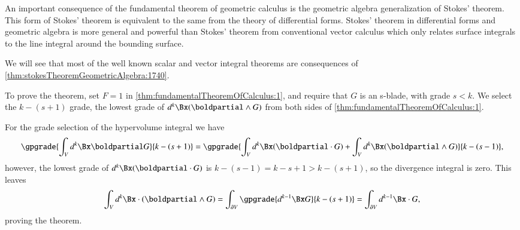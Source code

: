 %
%
An important consequence of the fundamental theorem of geometric calculus is the
geometric algebra generalization of Stokes' theorem.  This form of Stokes' theorem is equivalent to the same from the theory of differential forms.
Stokes' theorem in differential forms and geometric algebra is more general and powerful than Stokes' theorem from conventional vector calculus which only relates
surface integrals to the line integral around the bounding surface.


We will see that most of the well known scalar and vector integral theorems are consequences of \cref{thm:stokesTheoremGeometricAlgebra:1740}.

To prove the theorem, set \( F = 1 \) in \cref{thm:fundamentalTheoremOfCalculus:1}, and require that \( G \) is an s-blade, with grade \( s < k \).  We select the \( k-(s+1) \) grade, the lowest grade of \( d^k \Bx (\boldpartial \wedge G) \) from
both sides of
\cref{thm:fundamentalTheoremOfCalculus:1}.

For the grade selection of the hypervolume integral we have
\begin{dmath}\label{eqn:stokesTheoremTheStatement:100}
\gpgrade{ \int_V d^k \Bx \boldpartial G }{k-(s+1)}
=
\gpgrade{
\int_V d^k \Bx (\boldpartial \cdot G )
+
\int_V d^k \Bx (\boldpartial \wedge G )
}{k-(s-1)},
\end{dmath}
however, the lowest grade of \( d^k \Bx (\boldpartial \cdot G ) \) is \( k -(s-1) = k - s + 1 > k - (s+1) \), so the divergence integral is zero.  This leaves
\begin{dmath}\label{eqn:stokesTheoremTheStatement:110}
\int_V d^k \Bx \cdot (\boldpartial \wedge G )
= \int_{\partial V} \gpgrade{d^{k-1} \Bx G}{k-(s+1)}
= \int_{\partial V} d^{k-1} \Bx \cdot G,
\end{dmath}
proving the theorem.

